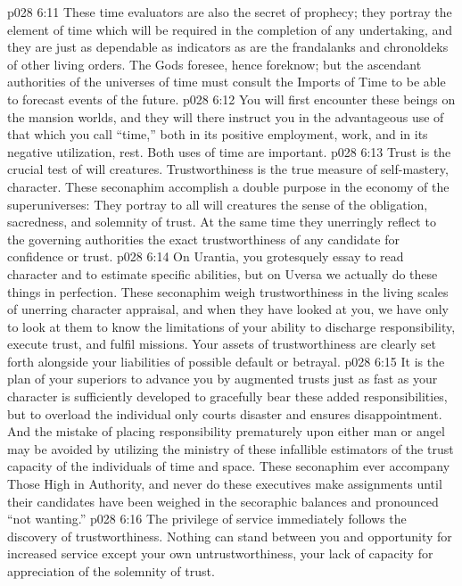 \vs p028 6:11 These time evaluators are also the secret of prophecy; they portray the element of time which will be required in the completion of any undertaking, and they are just as dependable as indicators as are the frandalanks and chronoldeks of other living orders. The Gods foresee, hence foreknow; but the ascendant authorities of the universes of time must consult the Imports of Time to be able to forecast events of the future.
\vs p028 6:12 You will first encounter these beings on the mansion worlds, and they will there instruct you in the advantageous use of that which you call “time,” both in its positive employment, work, and in its negative utilization, rest. Both uses of time are important.
\vs p028 6:13 \bibnobreakspace {} Trust is the crucial test of will creatures. Trustworthiness is the true measure of self\hyp{}mastery, character. These seconaphim accomplish a double purpose in the economy of the superuniverses: They portray to all will creatures the sense of the obligation, sacredness, and solemnity of trust. At the same time they unerringly reflect to the governing authorities the exact trustworthiness of any candidate for confidence or trust.
\vs p028 6:14 On Urantia, you grotesquely essay to read character and to estimate specific abilities, but on Uversa we actually do these things in perfection. These seconaphim weigh trustworthiness in the living scales of unerring character appraisal, and when they have looked at you, we have only to look at them to know the limitations of your ability to discharge responsibility, execute trust, and fulfil missions. Your assets of trustworthiness are clearly set forth alongside your liabilities of possible default or betrayal.
\vs p028 6:15 \pc It is the plan of your superiors to advance you by augmented trusts just as fast as your character is sufficiently developed to gracefully bear these added responsibilities, but to overload the individual only courts disaster and ensures disappointment. And the mistake of placing responsibility prematurely upon either man or angel may be avoided by utilizing the ministry of these infallible estimators of the trust capacity of the individuals of time and space. These seconaphim ever accompany Those High in Authority, and never do these executives make assignments until their candidates have been weighed in the secoraphic balances and pronounced “not wanting.”
\vs p028 6:16 \bibnobreakspace {} The privilege of service immediately follows the discovery of trustworthiness. Nothing can stand between you and opportunity for increased service except your own untrustworthiness, your lack of capacity for appreciation of the solemnity of trust.
